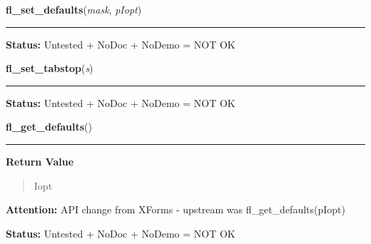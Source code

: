     \vspace{0.5ex}

\hspace{.8\funcindent}\begin{boxedminipage}{\funcwidth}

    \raggedright \textbf{fl\_set\_defaults}(\textit{mask}, \textit{pIopt})

    \vspace{-1.5ex}

    \rule{\textwidth}{0.5\fboxrule}
\setlength{\parskip}{2ex}
\setlength{\parskip}{1ex}
\textbf{Status:} Untested + NoDoc + NoDemo = NOT OK



    \end{boxedminipage}

    \label{xformslib:library:fl_set_tabstop}

    \vspace{0.5ex}

\hspace{.8\funcindent}\begin{boxedminipage}{\funcwidth}

    \raggedright \textbf{fl\_set\_tabstop}(\textit{s})

    \vspace{-1.5ex}

    \rule{\textwidth}{0.5\fboxrule}
\setlength{\parskip}{2ex}
\setlength{\parskip}{1ex}
\textbf{Status:} Untested + NoDoc + NoDemo = NOT OK



    \end{boxedminipage}

    \label{xformslib:library:fl_get_defaults}

    \vspace{0.5ex}

\hspace{.8\funcindent}\begin{boxedminipage}{\funcwidth}

    \raggedright \textbf{fl\_get\_defaults}()

    \vspace{-1.5ex}

    \rule{\textwidth}{0.5\fboxrule}
\setlength{\parskip}{2ex}
\setlength{\parskip}{1ex}
      \textbf{Return Value}
    \vspace{-1ex}

      \begin{quote}
      Iopt

      \end{quote}

\textbf{Attention:} API change from XForms - upstream was fl\_get\_defaults(pIopt)



\textbf{Status:} Untested + NoDoc + NoDemo = NOT OK



    \end{boxedminipage}

